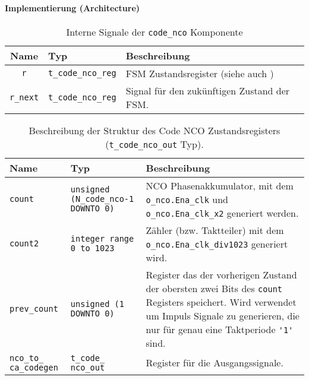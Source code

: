 \paragraph{Implementierung (Architecture)}

\begin{table}[htbp]
    \ttabbox
    {
        \caption[Code NCO interne Signale]{Interne Signale der \lstinline$code_nco$ Komponente}
        \label{TabCodeNCO_ArchSignals}
    }
    {
    \begin{tabular}{c  l p{5cm}}
        \toprule
        Name      & Typ         & Beschreibung \\
        \midrule
        \lstinline$r$		& \lstinline$t_code_nco_reg$	& \gls{FSM} Zustandsregister (siehe auch \TR{Tab_t_code_nco_reg_Type})\\
        \lstinline$r_next$	& \lstinline$t_code_nco_reg$	& Signal für den zukünftigen Zustand der \gls{FSM}.\\
        \bottomrule
    \end{tabular}
}
\end{table}

\begin{table}[htbp]
    \ttabbox
    {
        \caption[Typdefinition Code NCO Zustandsregister]{Beschreibung der Struktur des Code NCO Zustandsregisters (\lstinline$t_code_nco_out$ Typ).}
        \label{Tab_t_code_nco_reg_Type}
    }
    {
    \begin{tabular}{p{2cm}  p{2cm} p{6cm}}
        \toprule
        Name				& Typ						& Beschreibung \\
        \midrule
        \lstinline$count$		& \lstinline$unsigned (N_code_nco-1 DOWNTO 0)$	& NCO Phasenakkumulator, mit dem \lstinline$o_nco.Ena_clk$ und \lstinline$o_nco.Ena_clk_x2$ generiert werden. \\
        \lstinline$count2$		& \lstinline$integer range 0 to 1023$		& Zähler (bzw. Taktteiler) mit dem \lstinline$o_nco.Ena_clk_div1023$ generiert wird. \\
        \lstinline$prev_count$		& \lstinline$unsigned (1 DOWNTO 0)$		& Register das der vorherigen Zustand der obersten zwei Bits des  \lstinline$count$  Registers speichert. Wird verwendet um Impuls Signale zu generieren, die nur für genau eine Taktperiode \lstinline$'1'$ sind. \\
        \lstinline$nco_to_ ca_codegen$	& \lstinline$t_code_ nco_out$			& Register für die Ausgangssignale.\\
        \bottomrule
    \end{tabular}
}
\end{table}

